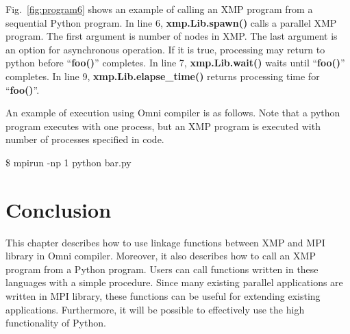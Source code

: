 \documentclass[graybox]{svmult}
\begin{document}

Fig.~\ref{fig:program6} shows an example of calling an XMP program from a sequential Python program.
In line 6, {\bf xmp.Lib.spawn()} calls a parallel XMP program.
The first argument is number of nodes in XMP.
The last argument is an option for asynchronous operation.
If it is true,  processing may return to python before ``{\bf foo()}'' completes.
In line 7, {\bf xmp.Lib.wait()} waits until ``{\bf foo()}'' completes.
In line 9, {\bf xmp.Lib.elapse\_time()} returns  processing time for ``{\bf foo()}''.

An example of execution using Omni compiler is as follows. 
Note that a python program executes with one process, but an XMP program is executed with number of processes specified in code.

\begin{svgraybox}
\$ mpirun -np 1 python bar.py
\end{svgraybox}

\section{Conclusion}
This chapter describes how to use  linkage functions between XMP and MPI library in Omni compiler. 
Moreover, it  also describes how to call  an XMP program from a Python program.
Users can call functions written in these languages with a simple procedure.
Since many existing parallel applications are written in MPI library, these functions can be useful for extending existing applications.
Furthermore, it will be possible to effectively use the high functionality of Python.


\end{document}
